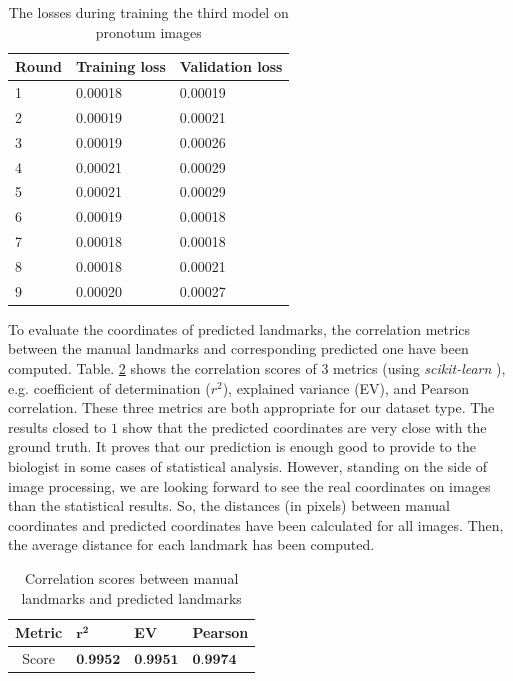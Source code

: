 \documentclass[review]{elsarticle}
\begin{document}
\begin{table}[h!]
	\centering
	\begin{tabular}{l l l}
	Round & Training loss & Validation loss \\ \hline
	1 & 0.00018 & 0.00019  \\ \hline
	2 & 0.00019 & 0.00021 \\ \hline
	3 & 0.00019 & 0.00026 \\ \hline
	4 & 0.00021 & 0.00029 \\ \hline
	5 & 0.00021 & 0.00029 \\ \hline
	6 & 0.00019 & 0.00018 \\ \hline
	7 & 0.00018 & 0.00018 \\ \hline
	8 & 0.00018 & 0.00021 \\ \hline
	9 & 0.00020 & 0.00027 \\ \hline
	\end{tabular}
	\caption{\small{The losses during training the third model on pronotum images}}
	\label{tbltrainingloss}
\end{table}

To evaluate the coordinates of predicted landmarks, the correlation metrics between the manual landmarks and corresponding predicted one have been computed. Table. \ref{tblcorrelation} shows the correlation scores of $3$ metrics (using \textit{scikit-learn} \cite{pedregosa2011scikit}), e.g. coefficient of determination ($r^2$), explained variance (EV), and Pearson correlation. These three metrics are both appropriate for our dataset type. The results closed to $1$ show that the predicted coordinates are very close with the ground truth. It proves that our prediction is enough good to provide to the biologist in some cases of statistical analysis. However, standing on the side of image processing, we are looking forward to see the real coordinates on images than the statistical results. So, the distances (in pixels) between manual coordinates and predicted coordinates have been calculated for all images. Then, the average distance for each landmark has been computed.

\begin{table}[htbp]
	\centering
	\begin{tabular}{|c|p{2cm}|p{2cm}|p{2cm}|}
		Metric & $\mathbf{r^{2}}$ & \textbf{EV} & \textbf{Pearson} \\ \hline
		Score & $\textbf{0.9952}$ & $\textbf{0.9951}$ & $\textbf{0.9974}$ 
	\end{tabular}
	\caption{Correlation scores between manual landmarks and predicted landmarks}
	\label{tblcorrelation}
\end{table}
\end{document}
